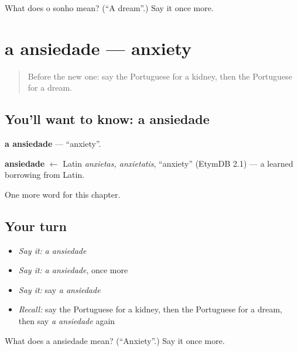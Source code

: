 \begin{tcolorbox}[breakable,colback=teal!4,colframe=teal!35!black,title={Before you move on}]
What does o sonho mean? (\textquotedblleft{}A dream\textquotedblright{}.) Say it once more.
\end{tcolorbox}
\section[a ansiedade]{a ansiedade — anxiety}

\label{lesson:PT-C149-ansiedade}



\begin{quote}
Before the new one: say the Portuguese for a kidney, then the Portuguese for a dream.
\end{quote}

\subsection*{You'll want to know: a ansiedade}
\textbf{a ansiedade} — \textquotedblleft{}anxiety\textquotedblright{}.

\begin{cousinweb}
\textbf{ansiedade} $\leftarrow$ Latin \emph{anxietas, anxietatis}, \textquotedblleft{}anxiety\textquotedblright{} (EtymDB 2.1) — a learned borrowing from Latin.
\end{cousinweb}

\begin{grammarlens}[title={What you've built}]
One more word for this chapter.
\end{grammarlens}

\subsection*{Your turn}
\begin{itemize}
\raggedright
  \item \emph{Say it:} \emph{a ansiedade}
  \item \emph{Say it:} \emph{a ansiedade}, once more
  \item \emph{Say it:} say \emph{a ansiedade}
  \item \emph{Recall:} say the Portuguese for a kidney, then the Portuguese for a dream, then say \emph{a ansiedade} again
\end{itemize}

\begin{tcolorbox}[breakable,colback=teal!4,colframe=teal!35!black,title={Before you move on}]
What does a ansiedade mean? (\textquotedblleft{}Anxiety\textquotedblright{}.) Say it once more.
\end{tcolorbox}
